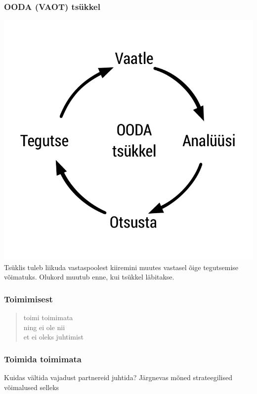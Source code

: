 \begin{frame}[fragile]
  \frametitle{OODA (VAOT) tsükkel}

	\begin{center}
		\includegraphics[width=.6\textwidth]{ooda.pdf}\\
		  	Tsüklis tuleb liikuda vastaspoolest kiiremini muutes vastasel õige tegutsemise võimatuks. Olukord muutub enne, kui tsükkel läbitakse.
	\end{center}
\end{frame}

\begin{frame}[fragile]
  \frametitle{Toimimisest}
	\begin{center}
		\begin{quote}
	toimi toimimata\\
	ning ei ole nii\\
	et ei oleks juhtimist
   		\end{quote}
	\end{center}
\cite{laozi}
\end{frame}

\begin{frame}[fragile]
  \frametitle{Toimida toimimata}
	\begin{center}
			Kuidas vältida vajadust partnereid juhtida?
			\vfill
			Järgnevas mõned strateegilised võimalused selleks
	\end{center}
\end{frame}


